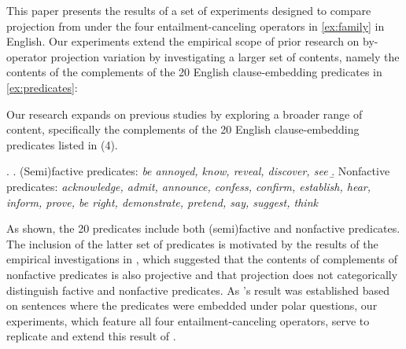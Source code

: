 \documentclass[a4paper,12pt,twoside]{article}
\newcommand{\poscite}[1]{\citeauthor{#1}'s \citeyear{#1}}
\begin{document}
    This paper presents the results of a set of experiments designed to compare projection from under the four entailment-canceling operators in \ref{ex:family} in English. Our experiments extend the empirical scope of prior research on by-operator projection variation by investigating a larger set of contents, namely the contents of the complements of the 20 English clause-embedding predicates in \ref{ex:predicates}:

    Our research expands on previous studies by exploring a broader range of content, specifically the complements of the 20 English clause-embedding predicates listed in (4).
    
    \ex. \label{ex:predicates}
    		\a. (Semi)factive predicates: {\em be annoyed, know, reveal, discover, see}
      \b. Nonfactive predicates: {\em acknowledge, admit, announce, confess, confirm, establish, hear, inform, prove, be right, demonstrate, pretend, say, suggest, think}
    
    As shown, the  20 predicates include both (semi)factive and nonfactive predicates. The inclusion of the latter set of predicates is motivated by the results of the empirical investigations in \citealt{degen_are_2022}, which suggested that the contents of complements of nonfactive predicates is also projective and that projection does not categorically distinguish factive and nonfactive predicates. As \poscite{degen_are_2022} result was established based on sentences where the predicates were embedded under polar questions, our experiments, which feature all four entailment-canceling operators, serve to replicate and extend this result of \citealt{degen_are_2022}.


	
\end{document}
